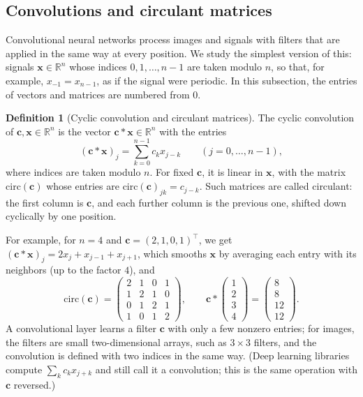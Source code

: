 \documentclass[11pt]{article}
\theoremstyle{definition}
\newtheorem{definition}{Definition}[section]
\theoremstyle{plain}
\theoremstyle{remark}
\begin{document}
\subsection{Convolutions and circulant matrices}\label{subsec:circulant}

Convolutional neural networks process images and signals with filters that are applied in the same way at every position. We study the simplest version of this: signals $\mathbf{x} \in \mathbb{R}^n$ whose indices $0, 1, \ldots, n - 1$ are taken modulo $n$, so that, for example, $x_{-1} = x_{n-1}$, as if the signal were periodic. In this subsection, the entries of vectors and matrices are numbered from $0$.

\begin{definition}[Cyclic convolution and circulant matrices]\label{def:circulant}
    The cyclic convolution of $\mathbf{c}, \mathbf{x} \in \mathbb{R}^n$ is the vector $\mathbf{c} \ast \mathbf{x} \in \mathbb{R}^n$ with the entries
    \[(\mathbf{c} \ast \mathbf{x})_j = \sum_{k=0}^{n-1} c_kx_{j-k} \qquad (j = 0, \ldots, n - 1),\]
    where indices are taken modulo $n$. For fixed $\mathbf{c}$, it is linear in $\mathbf{x}$, with the matrix $\mathrm{circ}(\mathbf{c})$ whose entries are $\mathrm{circ}(\mathbf{c})_{jk} = c_{j-k}$. Such matrices are called circulant: the first column is $\mathbf{c}$, and each further column is the previous one, shifted down cyclically by one position.
\end{definition}

For example, for $n = 4$ and $\mathbf{c} = (2, 1, 0, 1)^\top$, we get $(\mathbf{c} \ast \mathbf{x})_j = 2x_j + x_{j-1} + x_{j+1}$, which smooths $\mathbf{x}$ by averaging each entry with its neighbors (up to the factor $4$), and
\[\mathrm{circ}(\mathbf{c}) = \begin{pmatrix} 2 & 1 & 0 & 1 \\ 1 & 2 & 1 & 0 \\ 0 & 1 & 2 & 1 \\ 1 & 0 & 1 & 2 \end{pmatrix}, \qquad \mathbf{c} \ast \begin{pmatrix} 1 \\ 2 \\ 3 \\ 4 \end{pmatrix} = \begin{pmatrix} 8 \\ 8 \\ 12 \\ 12 \end{pmatrix}.\]
A convolutional layer learns a filter $\mathbf{c}$ with only a few nonzero entries; for images, the filters are small two-dimensional arrays, such as $3 \times 3$ filters, and the convolution is defined with two indices in the same way. (Deep learning libraries compute $\sum_k c_kx_{j+k}$ and still call it a convolution; this is the same operation with $\mathbf{c}$ reversed.)
\end{document}
